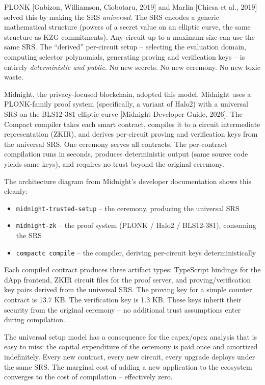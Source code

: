 \documentclass[
  11pt,
  openany]{report}
\providecommand{\tightlist}{%
  \setlength{\itemsep}{0pt}\setlength{\parskip}{0pt}}
\begin{document}
PLONK {[}Gabizon, Williamson, Ciobotaru, 2019{]} and Marlin {[}Chiesa et al.,
2019{]} solved this by making the SRS \emph{universal}. The SRS encodes a
generic mathematical structure (powers of a secret value on an elliptic curve,
the same structure as KZG commitments). Any circuit up to a maximum size can use
the same SRS. The ``derived'' per-circuit setup -- selecting the evaluation
domain, computing selector polynomials, generating proving and verification keys
-- is entirely \emph{deterministic and public}. No new secrets. No new ceremony.
No new toxic waste.

Midnight, the privacy-focused blockchain, adopted this model. Midnight uses a
PLONK-family proof system (specifically, a variant of Halo2) with a universal
SRS on the BLS12-381 elliptic curve {[}Midnight Developer Guide, 2026{]}. The
Compact compiler takes each smart contract, compiles it to a circuit
intermediate representation (ZKIR), and derives per-circuit proving and
verification keys from the universal SRS. One ceremony serves all contracts. The
per-contract compilation runs in seconds, produces deterministic output (same
source code yields same keys), and requires no trust beyond the original
ceremony.

The architecture diagram from Midnight's developer documentation shows this
cleanly:

\begin{itemize}
\tightlist
\item
  \texttt{midnight-trusted-setup} -- the ceremony, producing the universal SRS
\item
  \texttt{midnight-zk} -- the proof system (PLONK / Halo2 / BLS12-381),
  consuming the SRS
\item
  \texttt{compactc\ compile} -- the compiler, deriving per-circuit keys
  deterministically
\end{itemize}

Each compiled contract produces three artifact types: TypeScript bindings for
the dApp frontend, ZKIR circuit files for the proof server, and
proving/verification key pairs derived from the universal SRS. The proving key
for a simple counter contract is 13.7 KB. The verification key is 1.3 KB. These
keys inherit their security from the original ceremony -- no additional trust
assumptions enter during compilation.

The universal setup model has a consequence for the capex/opex analysis that is
easy to miss: the capital expenditure of the ceremony is paid once and amortized
indefinitely. Every new contract, every new circuit, every upgrade deploys under
the same SRS. The marginal cost of adding a new application to the ecosystem
converges to the cost of compilation -- effectively zero.
\end{document}
